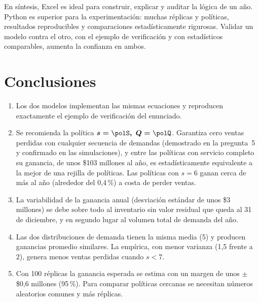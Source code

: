 En síntesis, Excel es ideal para construir, explicar y auditar la lógica de un año. Python es
superior para la experimentación: muchas réplicas y políticas, resultados reproducibles y
comparaciones estadísticamente rigurosas. Validar un modelo contra el otro, con el ejemplo de
verificación y con estadísticos comparables, aumenta la confianza en ambos.

\section{Conclusiones}

\begin{enumerate}
  \item Los dos modelos implementan las mismas ecuaciones y reproducen exactamente el ejemplo de
  verificación del enunciado.
  \item Se recomienda la política $\boldsymbol{s=\polS,\ Q=\polQ}$. Garantiza cero ventas
  perdidas con cualquier secuencia de demandas (demostrado en la pregunta~5 y confirmado en las
  simulaciones), y entre las políticas con servicio completo su ganancia, de unos \$103 millones
  al año, es estadísticamente equivalente a la mejor de una rejilla de \nPoliticasPy{} políticas.
  Las políticas con $s=6$ ganan cerca de \servGananciaMax{} más al año (alrededor del 0,4\,\%) a
  costa de perder ventas.
  \item La variabilidad de la ganancia anual (desviación estándar de unos \$3 millones) se debe
  sobre todo al inventario sin valor residual que queda al 31 de diciembre, y en segundo lugar al
  volumen total de demanda del año.
  \item Las dos distribuciones de demanda tienen la misma media (5) y producen ganancias
  promedio similares. La empírica, con menor varianza (1,5 frente a 2), genera menos ventas
  perdidas cuando $s<7$.
  \item Con 100 réplicas la ganancia esperada se estima con un margen de unos $\pm$\$0,6
  millones (95\,\%). Para comparar políticas cercanas se necesitan números aleatorios comunes y
  más réplicas.
\end{enumerate}

